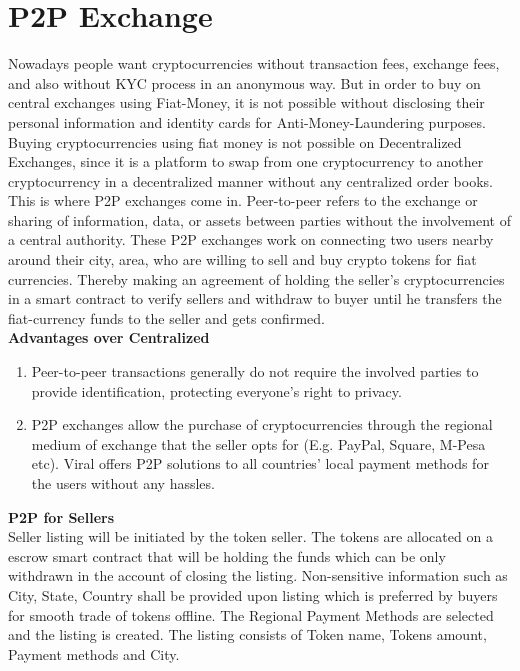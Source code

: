 \documentclass[conference]{IEEEtran}
\begin{document}
\section{\textbf{P2P Exchange}}

Nowadays people want cryptocurrencies without transaction fees, exchange fees, and also without KYC process in an anonymous way. But in order to buy on central exchanges using Fiat-Money, it is not possible without disclosing their personal information and identity cards for Anti-Money-Laundering purposes. Buying cryptocurrencies using fiat money is not possible on Decentralized Exchanges, since it is a platform to swap from one cryptocurrency to another cryptocurrency in a decentralized manner without any centralized order books.\\

This is where P2P exchanges come in. Peer-to-peer refers to the exchange or sharing of information, data, or assets between parties without the involvement of a central authority. These P2P exchanges work on connecting two users nearby around their city, area, who are willing to sell and buy crypto tokens for fiat currencies. Thereby making an agreement of holding the seller's cryptocurrencies in a smart contract to verify sellers and withdraw to buyer until he transfers the fiat-currency funds to the seller and gets confirmed.\\

\textbf{Advantages over Centralized}

\begin{enumerate}[wide, labelwidth=!, labelindent=0pt]
\item Peer-to-peer transactions generally do not require the involved parties to provide identification,  protecting everyone's right to privacy. 
\item P2P exchanges allow the purchase of cryptocurrencies through the regional medium of exchange that the seller opts for (E.g. PayPal, Square, M-Pesa  etc). Viral offers P2P solutions to all countries' local payment methods for the users without any hassles.
\end{enumerate}

\textbf{P2P for Sellers}\\

Seller listing will be initiated by the token seller. The tokens are allocated on a escrow smart contract that will be holding the funds which can be only withdrawn in the account of closing the listing. Non-sensitive information such as City, State, Country shall be provided upon listing which is preferred by buyers for smooth trade of tokens offline. The Regional Payment Methods are selected and the listing is created. The listing consists of Token name, Tokens amount, Payment methods and City.\\
\end{document}
